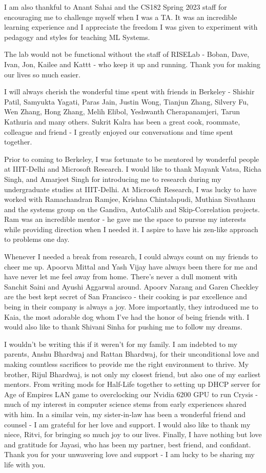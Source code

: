 \begin{acknowledgements}
I am also thankful to Anant Sahai and the CS182 Spring 2023 staff for encouraging me to challenge myself when I was a TA. It was an incredible learning experience and I appreciate the freedom I was given to experiment with pedagogy and styles for teaching ML Systems.

The lab would not be functional without the staff of RISELab - Boban, Dave, Ivan, Jon, Kailee and Kattt - who keep it up and running. Thank you for making our lives so much easier.

I will always cherish the wonderful time spent with friends in Berkeley - Shishir Patil, Samyukta Yagati, Paras Jain, Justin Wong, Tianjun Zhang, Silvery Fu, Wen Zhang, Hong Zhang, Melih Elibol, Yeshwanth Cherapanamjeri, Tarun Kathuria and many others. Sukrit Kalra has been a great cook, roommate, colleague and friend - I greatly enjoyed our conversations and time spent together. 

Prior to coming to Berkeley, I was fortunate to be mentored by wonderful people at IIIT-Delhi and Microsoft Research. I would like to thank Mayank Vatsa, Richa Singh, and Amarjeet Singh for introducing me to research during my undergraduate studies at IIIT-Delhi. At Microsoft Research, I was lucky to have worked with Ramachandran Ramjee, Krishna Chintalapudi, Muthian Sivathanu and the systems group on the Gandiva, AutoCalib and Skip-Correlation projects. Ram was an incredible mentor - he gave me the space to pursue my interests while providing direction when I needed it. I aspire to have his zen-like approach to problems one day. 

Whenever I needed a break from research, I could always count on my friends to cheer me up. Apoorva Mittal and Yash Vijay have always been there for me and have never let me feel away from home. There's never a dull moment with Sanchit Saini and Ayushi Aggarwal around. Apoorv Narang and Garen Checkley are the best kept secret of San Francisco - their cooking is par excellence and being in their company is always a joy. More importantly, they introduced me to Kaia, the most adorable dog whom I've had the honor of being friends with. I would also like to thank Shivani Sinha for pushing me to follow my dreams. 

I wouldn't be writing this if it weren't for my family. I am indebted to my parents, Anshu Bhardwaj and Rattan Bhardwaj, for their unconditional love and making countless sacrifices to provide me the right environment to thrive. My brother, Rijul Bhardwaj, is not only my closest friend, but also one of my earliest mentors. From writing mods for Half-Life together to setting up DHCP server for Age of Empires LAN game to overclocking our Nvidia 6200 GPU to run Crysis - much of my interest in computer science stems from early experiences shared with him. In a similar vein, my sister-in-law has been a wonderful friend and counsel - I am grateful for her love and support. I would also like to thank my niece, Ritvi, for bringing so much joy to our lives. Finally, I have nothing but love and gratitude for Jayasi, who has been my partner, best friend, and confidant. Thank you for your unwavering love and support - I am lucky to be sharing my life with you.



\end{acknowledgements}
